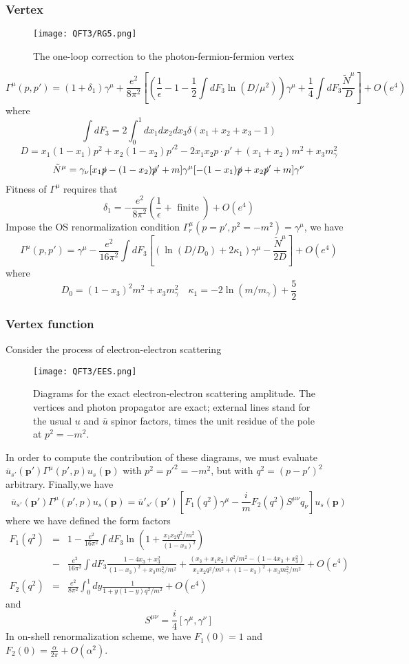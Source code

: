 \subsubsection{Vertex}
\begin{figure}[!h]
\centering
\texttt{[image: QFT3/RG5.png]}
\caption{The one-loop correction to the photon-fermion-fermion vertex}
\end{figure}
\[\Gamma^{\mu}(p,p') = (1+\delta_1)\gamma^{\mu} + \frac{e^2}{8\pi^2} \left[\left(\frac{1}{\epsilon} - 1 - \frac{1}{2} \int dF_3 \ln (D/\mu^2)\right)\gamma^{\mu} + \frac{1}{4} \int dF_3 \frac{\tilde{N}^{\mu}}{D}\right] + O(e^4)\]
where
\[\int dF_3 = 2 \int_0^1 dx_1 dx_2 dx_3 \delta(x_1+x_2+x_3-1)\]
\[D = x_1(1-x_1)p^2 + x_2(1-x_2)p'^2 - 2x_1x_2p \cdot p' + (x_1+x_2)m^2 + x_3 m_{\gamma}^2\]
\[\tilde{N}^{\mu} = \gamma_{\nu}[x_1\slashed{p}-(1-x_2)\slashed{p}'+m]\gamma^{\mu}[-(1-x_1)\slashed{p}+x_2\slashed{p}'+m]\gamma^{\nu}\]
Fitness of $\Gamma^{\mu}$ requires that
\[\delta_1 = -  \frac{e^2}{8\pi^2}(\frac{1}{\epsilon}+\mbox{ finite }) + O(e^4)\]
Impose the OS renormalization condition $\Gamma^{\mu}_r(p=p',p^2=-m^2) = \gamma^{\mu}$, we have
\[\Gamma^{\mu}(p,p') = \gamma^{\mu} - \frac{e^2}{16\pi^2} \int dF_3 \left[\left(\ln (D/D_0)+2\kappa_1\right)\gamma^{\mu} - \frac{\tilde{N}^{\mu}}{2D}\right] + O(e^4)\]
where
\[D_0 = (1-x_3)^2m^2 + x_3 m_{\gamma}^2 \quad \kappa_1 = -2 \ln(m/m_{\gamma}) + \frac{5}{2}\]

\subsubsection{Vertex function}
Consider the process of electron-electron scattering
\begin{figure}[!h]
\centering
\texttt{[image: QFT3/EES.png]}
\caption{Diagrams for the exact electron-electron scattering amplitude. The vertices and photon propagator are exact; external lines stand for the usual $u$ and $\bar{u}$ spinor factors, times the unit residue of the pole at $p^2=-m^2$.}
\end{figure}
In order to compute the contribution of these diagrams, we must evaluate $\overline{u}_{s'}(\bm{p}')\Gamma^{\mu}(p',p)u_s(\bm{p})$ with $p^2 = p'^2 = -m^2$, but with $q^2 = (p-p')^2$ arbitrary. Finally,we have 
\[\overline{u}_{s'}(\bm{p}')\Gamma^{\mu}(p',p)u_s(\bm{p}) = \overline{u}'_{s'}(\bm{p}')\left[F_1(q^2)\gamma^{\mu} - \frac{i}{m}F_2(q^2)S^{\mu\nu}q_{\nu}\right]u_s(\bm{p})\]
where we have defined the form factors
\begin{eqnarray}
F_1(q^2) &=& 1 - \frac{e^2}{16\pi^2} \int dF_3  \ln \left ( 1 + \frac{x_1x_2q^2/m^2}{(1-x_3)^2}\right ) \nonumber \\
&-& \frac{e^2}{16\pi^2} \int dF_3 \frac{1-4x_3+x_3^2}{(1-x_3)^2+x_3m_{\gamma}^2/m^2} + \frac{(x_3+x_1x_2)q^2/m^2-(1-4x_3+x_3^2)}{x_1x_2q^2/m^2+(1-x_3)^2+x_3m_{\gamma}^2/m^2} + O(e^4) \nonumber \\
F_2(q^2) &=& \frac{e^2}{8\pi^2} \int_0^1 dy \frac{1}{1 + y(1-y)q^2/m^2} + O(e^4) \nonumber
\end{eqnarray}
and
\[S^{\mu\nu}= \frac{i}{4}[\gamma^{\mu},\gamma^{\nu}]\]
In on-shell renormalization scheme, we have $F_1(0) = 1$ and $F_2(0) = \frac{\alpha}{2\pi} + O(\alpha^2)$.

